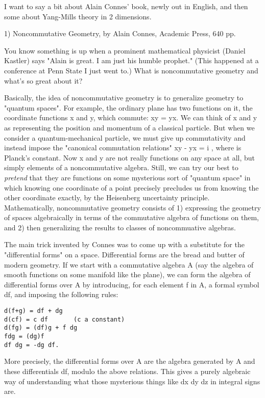 

I want to say a bit about Alain Connes' book, newly out in English, and
then some about Yang-Mills theory in 2 dimensions.

1) Noncommutative Geometry, by Alain Connes, Academic Press, 640 pp.

You know something is up when a prominent mathematical physicist (Daniel
Kastler) says "Alain is great.  I am just his humble prophet."  (This
happened at a conference at Penn State I just went to.)  What is
noncommutative geometry and what's so great about it?

Basically, the idea of noncommutative geometry is to generalize geometry
to "quantum spaces".  For example, the ordinary plane has two functions
on it, the coordinate functions x and y, which commute: xy = yx.  We can
think of x and y as representing the position and momentum of a
classical particle.  But when we consider a quantum-mechanical particle,
we must give up commutativity and instead impose the "canonical
commutation relations" xy - yx = i \hbar , where \hbar  is Planck's
constant.  Now x and y are not really functions on any space at all, but
simply elements of a noncommutative algebra.  Still, we can try our best
to \emph{pretend} that they are functions on some mysterious sort of
"quantum space" in which knowing one coordinate of a point
precisely precludes us from knowing the other coordinate exactly, by the
Heisenberg uncertainty principle.  Mathematically, noncommutative
geometry consists of 1) expressing the geometry of spaces algebraically
in terms of the commutative algebra of functions on them, and 2) then
generalizing the results to classes of noncommuative algebras.

The main trick invented by Connes was to come up with a substitute for
the "differential forms" on a space.  Differential forms are the bread
and butter of modern geometry.  If we start with a commutative algebra A
(say the algebra of smooth functions on some manifold like the plane),
we can form the algebra of differential forms over A by introducing, for
each element f in A, a formal symbol df, and imposing the following
rules:

\begin{verbatim}
d(f+g) = df + dg
d(cf) = c df       (c a constant)
d(fg) = (df)g + f dg
fdg = (dg)f
df dg = -dg df.
\end{verbatim}
    

More precisely, the differential forms over A are the algebra generated
by A and these differentials df, modulo the above relations.  This gives
a purely algebraic way of understanding what those mysterious things
like dx dy dz in integral signs are.  

